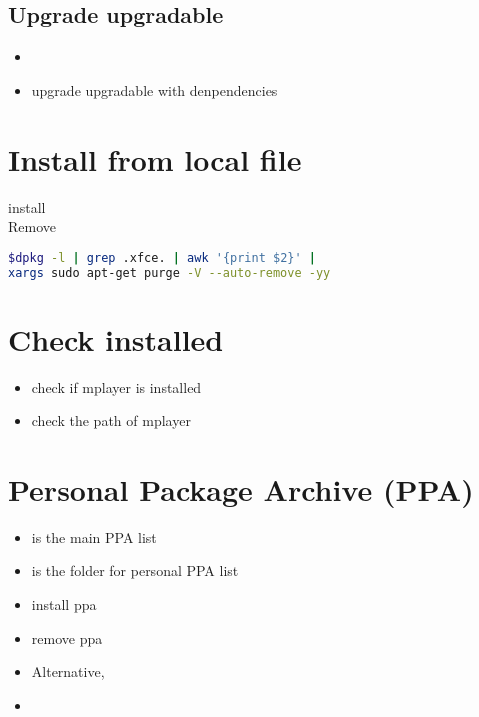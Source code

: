 \subsection{Upgrade upgradable}
\begin{itemize}
\item{}
\item{} upgrade upgradable with denpendencies
\end{itemize}

\section{Install from local file}
 install \\
 Remove

\begin{lstlisting}[language=bash, caption={Purge Xfce}]
$dpkg -l | grep .xfce. | awk '{print $2}' |
xargs sudo apt-get purge -V --auto-remove -yy
\end{lstlisting}

\section{Check installed}
\begin{itemize}
\item {} check if mplayer is installed
\item {} check the path of mplayer 
\end{itemize}


\section{Personal Package Archive (PPA)}

\begin{itemize}
\item{} is the main PPA list
\item{} is the folder for personal PPA list
\item{} install ppa
\item{} remove ppa
\item Alternative,
\item {}
\end{itemize}

